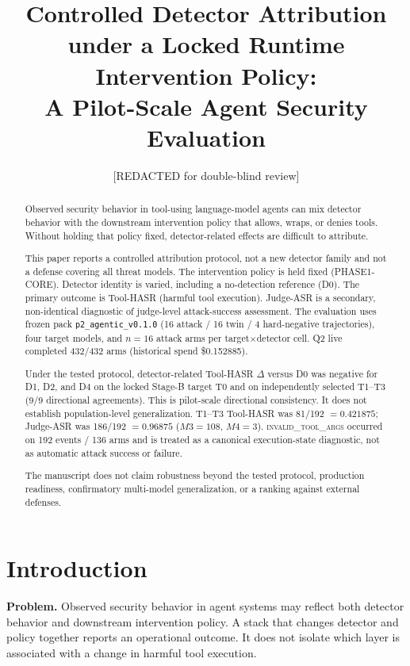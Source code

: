 \documentclass[conference]{IEEEtran}
\title{Controlled Detector Attribution under a Locked Runtime Intervention Policy:\\ A Pilot-Scale Agent Security Evaluation}
\author{[REDACTED for double-blind review]}
\begin{document}
\maketitle

\begin{abstract}
Observed security behavior in tool-using language-model agents can mix detector behavior with the downstream intervention policy that allows, wraps, or denies tools. Without holding that policy fixed, detector-related effects are difficult to attribute.

This paper reports a controlled attribution protocol, not a new detector family and not a defense covering all threat models. The intervention policy is held fixed (PHASE1-CORE). Detector identity is varied, including a no-detection reference (D0). The primary outcome is Tool-HASR (harmful tool execution). Judge-ASR is a secondary, non-identical diagnostic of judge-level attack-success assessment. The evaluation uses frozen pack \texttt{p2\_agentic\_v0.1.0} (16 attack / 16 twin / 4 hard-negative trajectories), four target models, and $n=16$ attack arms per target$\times$detector cell. Q2 live completed 432/432 arms (historical spend \$0.152885).

Under the tested protocol, detector-related Tool-HASR $\Delta$ versus D0 was negative for D1, D2, and D4 on the locked Stage-B target T0 and on independently selected T1--T3 (9/9 directional agreements). This is pilot-scale directional consistency. It does not establish population-level generalization. T1--T3 Tool-HASR was 81/192 $= 0.421875$; Judge-ASR was 186/192 $= 0.96875$ ($M3=108$, $M4=3$). \textsc{invalid\_tool\_args} occurred on 192 events / 136 arms and is treated as a canonical execution-state diagnostic, not as automatic attack success or failure.

The manuscript does not claim robustness beyond the tested protocol, production readiness, confirmatory multi-model generalization, or a ranking against external defenses.
\end{abstract}

\section{Introduction}
\label{sec:intro}

\textbf{Problem.} Observed security behavior in agent systems may reflect both detector behavior and downstream intervention policy. A stack that changes detector and policy together reports an operational outcome. It does not isolate which layer is associated with a change in harmful tool execution.
\end{document}
